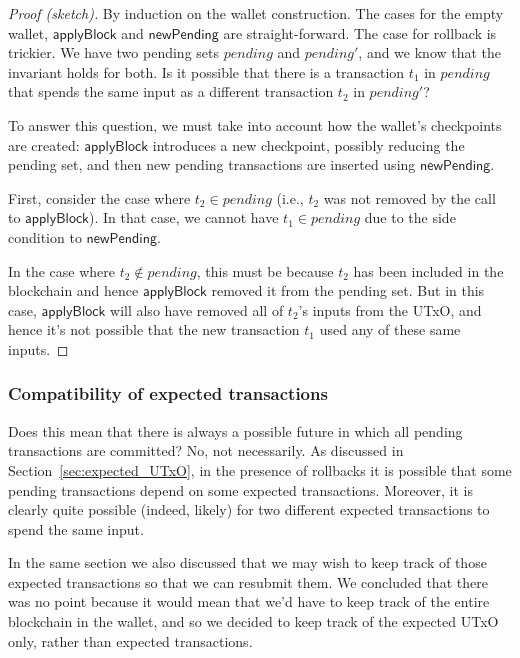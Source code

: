 \documentclass{article}
\begin{document}
\begin{proof}[Proof (sketch)]
By induction on the wallet construction. The cases for the empty wallet,
$\mathsf{applyBlock}$ and $\mathsf{newPending}$ are straight-forward.
The case for rollback is trickier. We have two pending sets
$\mathit{pending}$ and $\mathit{pending'}$, and we know that the invariant
holds for both. Is it possible that there is a transaction $t_1$ in $\mathit{pending}$
that spends the same input as a different transaction $t_2$ in $\mathit{pending}'$?

To answer this question, we must take into account how the wallet's checkpoints
are created: $\mathsf{applyBlock}$ introduces a new checkpoint, possibly
reducing the pending set, and then new pending transactions are inserted using
$\mathsf{newPending}$.

First, consider the case where $t_2 \in \mathit{pending}$ (i.e., $t_2$ was not
removed by the call to $\mathsf{applyBlock}$). In that case, we cannot have $t_1
\in \mathit{pending}$ due to the side condition to $\mathsf{newPending}$.

In the case where $t_2 \notin \mathit{pending}$, this must be because $t_2$
has been included in the blockchain and hence $\mathsf{applyBlock}$ removed
it from the pending set. But in this case, $\mathsf{applyBlock}$ will also
have removed all of $t_2$'s inputs from the UTxO, and hence it's not possible
that the new transaction $t_1$ used any of these same inputs.
\end{proof}


\subsubsection{Compatibility of expected transactions}
\label{sec:compat_of_expected_trans}

Does this mean that there is always a possible future in which all pending
transactions are committed? No, not necessarily. As discussed in
Section~\ref{sec:expected_UTxO}, in the presence of rollbacks it is possible
that some pending transactions depend on some expected transactions. Moreover,
it is clearly quite possible (indeed, likely) for two different expected
transactions to spend the same input.

In the same section we also discussed that we may wish to keep track of those
expected transactions so that we can resubmit them. We concluded that there
was no point because it would mean that we'd have to keep track of the
entire blockchain in the wallet, and so we decided to keep track of the
expected UTxO only, rather than expected transactions.
\end{document}
